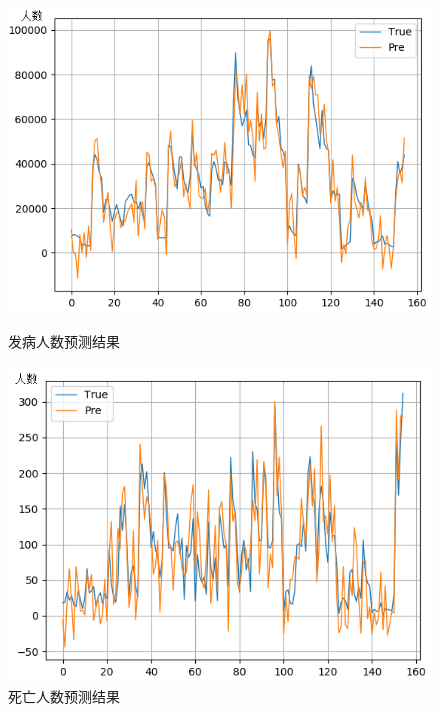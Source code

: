 \documentclass{whutmod}
\begin{document}
  \begin{figure}[H]
  	\begin{minipage}[t]{0.5\linewidth}
  		\centering
  		\includegraphics[width=\textwidth]{figures/Figure_9.png}
  		\caption{发病人数预测结果}\label{Figure_9}
  	\end{minipage}
  	\hfill%
  	\begin{minipage}[t]{0.5\linewidth}
  		\centering
  		\includegraphics[width=\textwidth]{figures/Figure_10.png}
  		\caption{死亡人数预测结果}\label{Figure_10}
  	\end{minipage}
  \end{figure}
  
\end{document}
